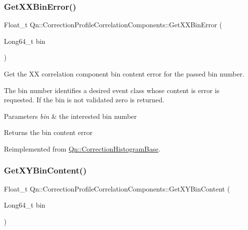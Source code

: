 \subsubsection{\texorpdfstring{Get\+X\+X\+Bin\+Error()}{GetXXBinError()}}
{\footnotesize\ttfamily Float\+\_\+t Qn\+::\+Correction\+Profile\+Correlation\+Components\+::\+Get\+X\+X\+Bin\+Error (\begin{DoxyParamCaption}\item[{Long64\+\_\+t}]{bin }\end{DoxyParamCaption})\hspace{0.3cm}{\ttfamily [virtual]}}

Get the XX correlation component bin content error for the passed bin number.

The bin number identifies a desired event class whose content is error is requested. If the bin is not validated zero is returned.


\begin{DoxyParams}{Parameters}
{\em bin} & the interested bin number \\
\hline
\end{DoxyParams}
\begin{DoxyReturn}{Returns}
the bin content error 
\end{DoxyReturn}


Reimplemented from \mbox{\hyperlink{classQn_1_1CorrectionHistogramBase_ae7b4e0bfb45e52cc7050eefc78c5230e}{Qn\+::\+Correction\+Histogram\+Base}}.

\mbox{\label{classQn_1_1CorrectionProfileCorrelationComponents_ad690503e78ddf4017cd8813bb12e8583}} 
\subsubsection{\texorpdfstring{Get\+X\+Y\+Bin\+Content()}{GetXYBinContent()}}
{\footnotesize\ttfamily Float\+\_\+t Qn\+::\+Correction\+Profile\+Correlation\+Components\+::\+Get\+X\+Y\+Bin\+Content (\begin{DoxyParamCaption}\item[{Long64\+\_\+t}]{bin }\end{DoxyParamCaption})\hspace{0.3cm}{\ttfamily [virtual]}}

